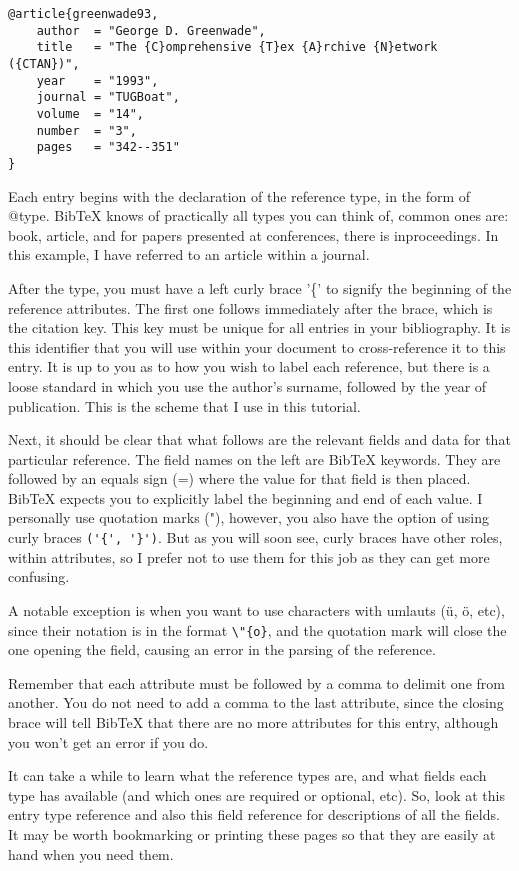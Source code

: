 \begin{refsection}
\begin{verbatim}
@article{greenwade93,
    author  = "George D. Greenwade",
    title   = "The {C}omprehensive {T}ex {A}rchive {N}etwork ({CTAN})",
    year    = "1993",
    journal = "TUGBoat",
    volume  = "14",
    number  = "3",
    pages   = "342--351"
}
\end{verbatim}

Each entry begins with the declaration of the reference type, in the form of @type. BibTeX knows of practically all types you can think of, common ones are: book, article, and for papers presented at conferences, there is inproceedings. In this example, I have referred to an article within a journal.


After the type, you must have a left curly brace '\{' to signify the beginning of the reference attributes. The first one follows immediately after the brace, which is the citation key. This key must be unique for all entries in your bibliography. It is this identifier that you will use within your document to cross-reference it to this entry. It is up to you as to how you wish to label each reference, but there is a loose standard in which you use the author's surname, followed by the year of publication. This is the scheme that I use in this tutorial.

Next, it should be clear that what follows are the relevant fields and data for that particular reference. The field names on the left are BibTeX keywords. They are followed by an equals sign (=) where the value for that field is then placed. BibTeX expects you to explicitly label the beginning and end of each value. I personally use quotation marks ("), however, you also have the option of using curly braces \verb+('{', '}')+. But as you will soon see, curly braces have other roles, within attributes, so I prefer not to use them for this job as they can get more confusing. 

A notable exception is when you want to use characters with umlauts (ü, ö, etc), since their notation is in the format \verb+\"{o}+, and the quotation mark will close the one opening the field, causing an error in the parsing of the reference.

Remember that each attribute must be followed by a comma to delimit one from another. You do not need to add a comma to the last attribute, since the closing brace will tell BibTeX that there are no more attributes for this entry, although you won't get an error if you do.

It can take a while to learn what the reference types are, and what fields each type has available (and which ones are required or optional, etc). So, look at this entry type reference and also this field reference for descriptions of all the fields. It may be worth bookmarking or printing these pages so that they are easily at hand when you need them.





\end{refsection}
